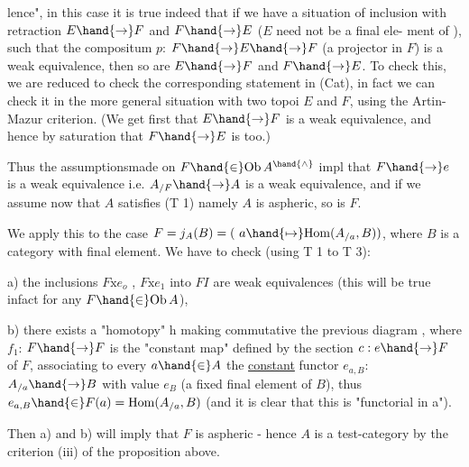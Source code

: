
lence",  in this case it is true indeed that if we have a situation of
inclusion with retraction  $E\hand{\to} F$ and $F\hand{\to} E$  ($E$ need not be a final ele-%
ment of  ),  such that the compositum  $p$: $F\hand{\to} E\hand{\to} F$  (a projector in
$F$) is a weak equivalence,  then so are $E\hand{\to} F$ and $F\hand{\to} E$.  To check this,
we are reduced to check the corresponding statement in (Cat),  in fact we
can check it in the more general situation with two topoi $E$ and $F$,  using
the Artin-Mazur criterion.  (We get first that $E\hand{\to} F$ is a weak equivalence,
and hence by saturation that $F\hand{\to} E$ is too.)

Thus the assumptions\hand{/}made on $F\hand{\in} \mathrm{Ob}\,A^{\hand{\wedge}}$ impl that  $F\hand{\to} e$ is a weak
equivalence i.e.  $A_{/F}\hand{\to} A$ is a weak equivalence,  and if we assume now
that $A$ satisfies (T 1) namely $A$ is aspheric,  so is $F$.

We apply this to the case  $F = j_A(B) = (\ a\hand{\mapsto} \mathrm{Hom}(A_{/a},B))$,  where $B$
is a \inserted{[small]} category with final element.  We have to check (using T 1 to T 3):

a) the inclusions  $F\mathrm{x}e_o$ , $F\mathrm{x}e_1$ into $F$$I$ are weak equivalences (this will
be true in\hand{/}fact for any $F\hand{\in}\mathrm{Ob}\,A$\hand{$\hat{}$}),

b) there exists a "homotopy" h making commutative the previous diagram ,
where  $f_1$:  $F\hand{\to} F$ is the "constant map" defined by the section
$c : e\hand{\to} F$ of $F$,  associating to every $a\hand{\in} A$ the \uline{constant} functor
$e_{a,B}$: $A_{/a}\hand{\to} B$  with value $e_B$ (a fixed final element of $B$),  thus
$e_{a,B}\hand{\in} F(a) = \mathrm{Hom}(A_{/a},B)$  (and it is clear that this is "functorial
in a").

Then  a) and b) will imply that $F$ is aspheric - hence $A$ is a test-category
by the criterion (iii) of the proposition above.

